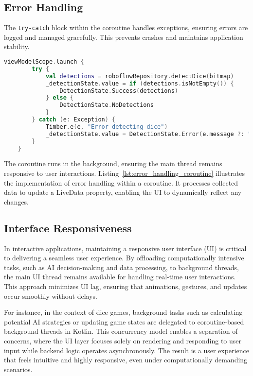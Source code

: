 \subsection{Error Handling}

The \texttt{try-catch} block within the coroutine handles exceptions, ensuring errors are logged and managed gracefully. This prevents crashes and maintains application stability.
\begin{lstlisting}[language=Kotlin, caption={Error Handling in Coroutines}, label=lst:error_handling_coroutine]
    viewModelScope.launch {
        try {
            val detections = roboflowRepository.detectDice(bitmap)
            _detectionState.value = if (detections.isNotEmpty()) {
                DetectionState.Success(detections)
            } else {
                DetectionState.NoDetections
            }
        } catch (e: Exception) {
            Timber.e(e, "Error detecting dice")
            _detectionState.value = DetectionState.Error(e.message ?: "Unknown error")
        }
    }
\end{lstlisting}

The coroutine runs in the background, ensuring the main thread remains responsive to user interactions. Listing~\ref{lst:error_handling_coroutine} illustrates the implementation of error handling within a coroutine. It processes collected data to update a LiveData property, enabling the UI to dynamically reflect any changes.

\subsection{Interface Responsiveness}

In interactive applications, maintaining a responsive user interface (UI) is critical to delivering a seamless user experience. By offloading computationally intensive tasks, such as AI decision-making and data processing, to background threads, the main UI thread remains available for handling real-time user interactions. This approach minimizes UI lag, ensuring that animations, gestures, and updates occur smoothly without delays.

For instance, in the context of dice games, background tasks such as calculating potential AI strategies or updating game states are delegated to coroutine-based background threads in Kotlin. This concurrency model enables a separation of concerns, where the UI layer focuses solely on rendering and responding to user input while backend logic operates asynchronously. The result is a user experience that feels intuitive and highly responsive, even under computationally demanding scenarios.

